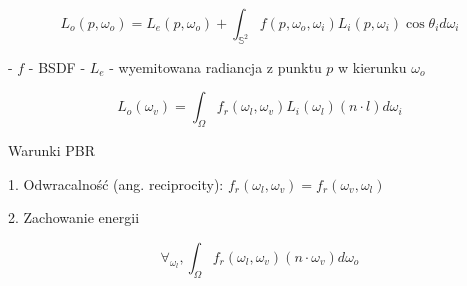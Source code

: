 \documentclass[../main.tex]{subfiles}
\begin{document}
$$
L_o(p, \omega_o) =
  L_e(p, \omega_o) +
  \int_{\mathbb{S}^2} {
    f(p, \omega_o, \omega_i)
    L_i(p, \omega_i)
    \cos \theta_i
    d\omega_i
  }
$$

- $f$ - BSDF
- $L_e$ - wyemitowana radiancja z punktu $p$ w kierunku $\omega_o$

$$
L_o(\omega_v) = \int_{\Omega} {
    f_r(\omega_l, \omega_v)
    L_i(\omega_l)
    (n \cdot l)
    d \omega_i
}
$$

Warunki PBR

1. Odwracalność (ang. reciprocity):
	$f_r(\omega_l, \omega_v) = f_r(\omega_v, \omega_l)$

2. Zachowanie energii

$$
\forall_{\omega_l}, \int_{\Omega} {
    f_r(\omega_l, \omega_v)
    (n \cdot \omega_v) d\omega_o
}
$$
\end{document}
